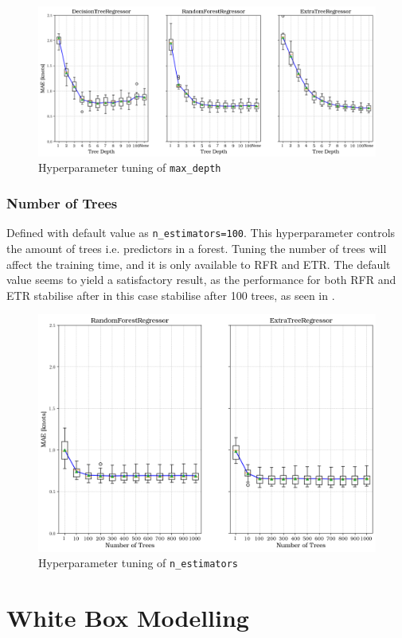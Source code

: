 \begin{figure}[h]
    \centering
        \includegraphics[width=.85\textwidth]{02_figures/hpo_max_depth_mae.png}
        \caption{Hyperparameter tuning of {\tt max\_depth}}
        \label{fig:hpo_max_depth}
\end{figure}

\subsubsection*{Number of Trees}\label{sec:n_estimators}

Defined with default value as {\tt n\_estimators=100}. This hyperparameter controls the amount of trees i.e. predictors in a forest. Tuning the number of trees will affect the training time, and it is only available to RFR and ETR. The default value seems to yield a satisfactory result, as the performance for both RFR and ETR stabilise after in this case stabilise after 100 trees, as seen in .
\begin{figure}[h]
    \centering
        \includegraphics[width=.6\textwidth]{02_figures/hpo_n_estimators_mae.png}
        \caption{Hyperparameter tuning of {\tt n\_estimators}}
        \label{fig:n_estimators}
\end{figure}

\section{White Box Modelling}\label{sec:WBM_modelling}

